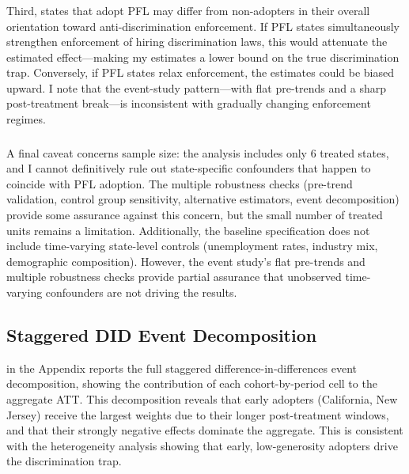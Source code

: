 \documentclass[12pt]{article}
\begin{document}
\subsubsection*{}
Third, states that adopt PFL may differ from non-adopters in their overall orientation toward anti-discrimination enforcement. If PFL states simultaneously strengthen enforcement of hiring discrimination laws, this would attenuate the estimated effect---making my estimates a lower bound on the true discrimination trap. Conversely, if PFL states relax enforcement, the estimates could be biased upward. I note that the event-study pattern---with flat pre-trends and a sharp post-treatment break---is inconsistent with gradually changing enforcement regimes.

\subsubsection*{}
A final caveat concerns sample size: the analysis includes only 6 treated states, and I cannot definitively rule out state-specific confounders that happen to coincide with PFL adoption. The multiple robustness checks (pre-trend validation, control group sensitivity, alternative estimators, event decomposition) provide some assurance against this concern, but the small number of treated units remains a limitation. Additionally, the baseline specification does not include time-varying state-level controls (unemployment rates, industry mix, demographic composition). However, the event study's flat pre-trends and multiple robustness checks provide partial assurance that unobserved time-varying confounders are not driving the results.

\subsection{Staggered DID Event Decomposition}

 in the Appendix reports the full staggered difference-in-differences event decomposition, showing the contribution of each cohort-by-period cell to the aggregate ATT. This decomposition reveals that early adopters (California, New Jersey) receive the largest weights due to their longer post-treatment windows, and that their strongly negative effects dominate the aggregate. This is consistent with the heterogeneity analysis showing that early, low-generosity adopters drive the discrimination trap.


\end{document}
